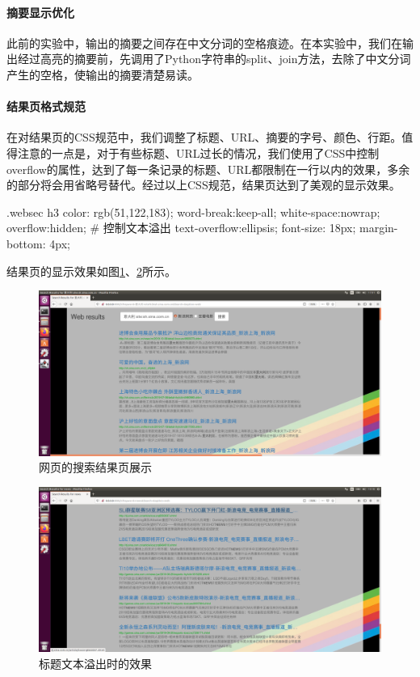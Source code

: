 \documentclass{article}
\begin{document}
\paragraph{摘要显示优化} 此前的实验中，输出的摘要之间存在中文分词的空格痕迹。在本实验中，我们在输出经过高亮的摘要前，先调用了Python字符串的split、join方法，去除了中文分词产生的空格，使输出的摘要清楚易读。

\paragraph{结果页格式规范}
在对结果页的CSS规范中，我们调整了标题、URL、摘要的字号、颜色、行距。值得注意的一点是，对于有些标题、URL过长的情况，我们使用了CSS中控制overflow的属性，达到了每一条记录的标题、URL都限制在一行以内的效果，多余的部分将会用省略号替代。经过以上CSS规范，结果页达到了美观的显示效果。

\begin{python}
.websec h3 
{
	color: rgb(51,122,183);
	word-break:keep-all;
	white-space:nowrap;
	overflow:hidden;         # 控制文本溢出
	text-overflow:ellipsis;
	font-size: 18px;
	margin-bottom: 4px;
}
\end{python}

结果页的显示效果如图\ref{fig:res}、\ref{fig:res2}所示。

\begin{figure}[htbp]
\centering
\includegraphics[width=13.5cm]{img/web.png}
\caption{网页的搜索结果页展示}
\label{fig:res}
\end{figure}

\begin{figure}[htbp]
\centering
\includegraphics[width=13.5cm]{img/res2.png}
\caption{标题文本溢出时的效果}
\label{fig:res2}
\end{figure}
\end{document}
